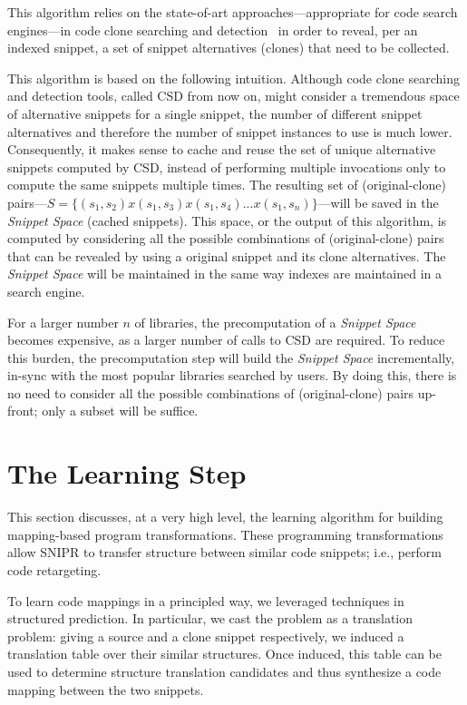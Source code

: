 This algorithm relies on the state-of-art approaches---appropriate for code search engines---in code clone searching and detection~\cite{Jiang:2007cj, Roh:2010ts} in order to reveal, per an indexed snippet, a set of snippet alternatives (clones) that need to be collected.

This algorithm is based on the following intuition. Although code clone searching and detection tools, called CSD from now on, might consider a tremendous space of alternative snippets for a single snippet, the number of different snippet alternatives and therefore the number of snippet instances to use is much lower. Consequently, it makes sense to cache and reuse the set of unique alternative snippets computed by CSD, instead of performing multiple invocations only to compute the same snippets multiple times. The resulting set of (original-clone) pairs---$S = \{(s_1, s_2) x (s_1, s_3) x (s_1, s_4) ... x (s_1, s_n)\}$---will be saved in the \emph{Snippet Space} (cached snippets). This space, or the output of this algorithm, is computed by considering all the possible combinations of (original-clone) pairs that can be revealed by using a original snippet and its clone alternatives. The \emph{Snippet Space} will be maintained in the same way indexes are maintained in a search engine.

For a larger number $n$ of libraries, the precomputation of a \emph{Snippet Space} becomes expensive, as a larger number of calls to CSD are required. To reduce this burden, the precomputation step will build the \emph{Snippet Space} incrementally, in-sync with the most popular libraries searched by users. By doing this, there is no need to consider all the possible combinations of (original-clone) pairs up-front; only a subset will be suffice.

\section{The Learning Step}
\label{sec:learning}

This section discusses, at a very high level, the learning algorithm for building mapping-based program transformations. These programming transformations allow \uppercase{SnipR} to transfer structure between similar code snippets; i.e., perform code retargeting.

To learn code mappings in a principled way, we leveraged techniques in structured prediction. In particular, we cast the problem as a translation problem: giving a source and a clone snippet respectively, we induced a translation table over their similar structures. Once induced, this table can be used to determine structure translation candidates and thus synthesize a code mapping between the two snippets. 

